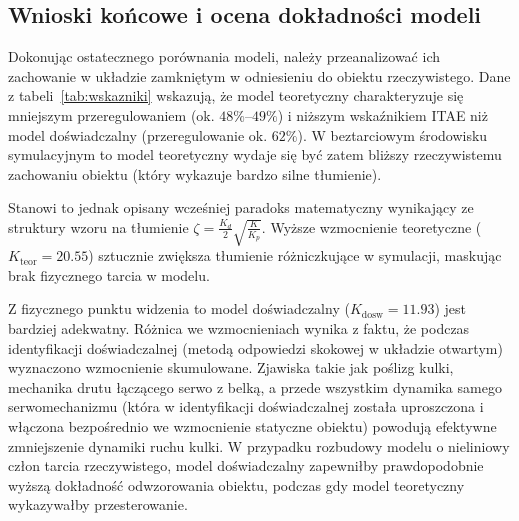 \subsection{Wnioski końcowe i ocena dokładności modeli}
Dokonując ostatecznego porównania modeli, należy przeanalizować ich zachowanie w układzie
zamkniętym w odniesieniu do obiektu rzeczywistego. Dane z tabeli~\ref{tab:wskazniki}
wskazują, że model teoretyczny charakteryzuje się mniejszym przeregulowaniem (ok.
$48\%$--$49\%$) i niższym wskaźnikiem ITAE niż model doświadczalny (przeregulowanie
ok. $62\%$). W beztarciowym środowisku symulacyjnym to model teoretyczny wydaje się być
zatem bliższy rzeczywistemu zachowaniu obiektu (który wykazuje bardzo silne tłumienie).

Stanowi to jednak opisany wcześniej paradoks matematyczny wynikający ze struktury
wzoru na tłumienie $\zeta = \frac{K_d}{2}\sqrt{\frac{K}{K_p}}$. Wyższe wzmocnienie
teoretyczne ($K_{\text{teor}} = 20.55$) sztucznie zwiększa tłumienie różniczkujące w symulacji,
maskując brak fizycznego tarcia w modelu. 

Z fizycznego punktu widzenia to model doświadczalny ($K_{\text{dosw}} = 11.93$) jest
bardziej adekwatny. Różnica we wzmocnieniach wynika z faktu, że podczas identyfikacji
doświadczalnej (metodą odpowiedzi skokowej w układzie otwartym) wyznaczono wzmocnienie
skumulowane. Zjawiska takie jak poślizg kulki, mechanika drutu łączącego serwo z belką, 
a przede wszystkim dynamika samego serwomechanizmu
(która w identyfikacji doświadczalnej została uproszczona i włączona bezpośrednio
we wzmocnienie statyczne obiektu) powodują efektywne zmniejszenie dynamiki ruchu kulki.
W przypadku rozbudowy modelu o nieliniowy człon tarcia rzeczywistego, model doświadczalny
zapewniłby prawdopodobnie wyższą dokładność odwzorowania obiektu, podczas gdy model teoretyczny
wykazywałby przesterowanie.
